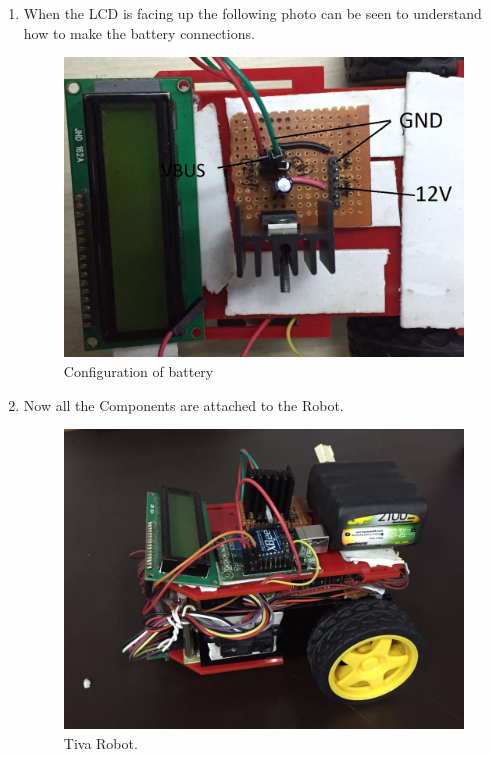 \documentclass[a4paper,12pt,oneside]{book}
\begin{document}
\begin{enumerate}
	\item When the LCD is facing up the following photo can be seen to understand how to make the battery connections.
	\begin{figure}[h]
		\centering
		\includegraphics[scale=0.16]{battery_config}
		\caption{ Configuration of battery}
	\end{figure}
	\newpage
	\item Now all the Components are attached to the Robot.
	\begin{figure}[h]
		\centering
		\includegraphics[scale=0.16]{robot}
		\caption{Tiva Robot.}
	\end{figure}
	\newpage
\end{enumerate}
\end{document}
